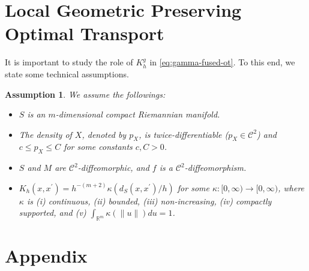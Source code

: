 \documentclass{article}
\newtheorem{assumption}{Assumption}
\begin{document}
\section{Local Geometric Preserving Optimal Transport}

It is important to study the role of $K^g_h$ in \eqref{eq:gamma-fused-ot}. To this end, we state some technical assumptions.
\begin{assumption}
	\label{ass:kernel-analysis}
	We assume the followings:
	\begin{itemize}
		\item[(A1)] $S$ is an $m$-dimensional compact Riemannian manifold.
		\item[(A2)] The density of $X$, denoted by $p_X$, is twice-differentiable ($p_X \in \mathcal{C}^2$) and $c \leq p_X \leq C$ for some constants $c,C > 0$.
		\item[(A3)] $S$ and $M$ are $\mathcal{C}^2$-diffeomorphic, and $f$ is a $\mathcal{C}^2$-diffeomorphism.
		\item[(A4)] $K_h(x,x^\prime) = h^{-(m+2)}\kappa(d_S(x,x^\prime)/h)$ for some $\kappa : [0,\infty) \to [0,\infty)$, where $\kappa$ is (i) continuous, (ii) bounded, (iii) non-increasing, (iv) compactly supported, and (v) $\int_{\mathbb{R}^m} \kappa(\|u\|) du = 1$.
	\end{itemize}
\end{assumption}







\appendix
\section{Appendix}
\end{document}
